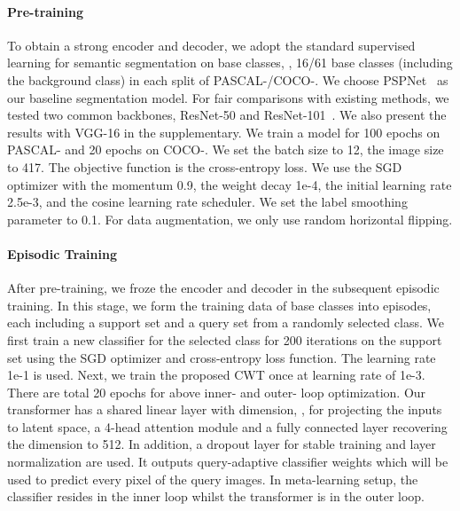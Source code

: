 \documentclass[10pt,twocolumn,letterpaper]{article}
\begin{document}
\paragraph{Pre-training} 
\label{sec:pretraining}
To obtain a strong encoder and decoder,
we adopt the standard supervised learning for semantic segmentation on base classes, \ie, 16/61 base classes (including the background class) in each split of PASCAL-/COCO-. We choose PSPNet~\cite{zhao2017pyramid} as our baseline segmentation model. 
For fair comparisons with existing methods, we tested two common backbones, ResNet-50 and ResNet-101~\cite{he2016deep}. 
We also present the results with VGG-16 in the supplementary.
We train a model for 100 epochs on PASCAL- and 20 epochs on COCO-.
We set the batch size to 12, the image size to 417.
The objective function is the cross-entropy loss. 
We use the SGD optimizer with the momentum 0.9, 
the weight decay 1e-4, the initial learning rate 2.5e-3,
and the cosine learning rate scheduler. 
We set the label smoothing parameter  to 0.1.
For data augmentation, we only use random horizontal flipping.
\vspace{-0.5cm}



\paragraph{Episodic Training}
After pre-training, we froze the encoder and decoder in the subsequent episodic training. 
In this stage, we form the training data of base classes into episodes, each including a support set and a query set from a randomly selected class. 
We first train a new classifier for the selected class for 
200 iterations on the support set using the SGD optimizer and cross-entropy loss function.
The learning rate 1e-1 is used.
Next, we train the proposed CWT once at learning rate of 1e-3.
There are total 20 epochs for above inner- and outer- loop optimization.
Our transformer has a shared linear layer with dimension, , for projecting the inputs to latent space, a 4-head attention module and a fully connected layer recovering the dimension to 512. In addition, a dropout layer for stable training and layer normalization are used.
It outputs query-adaptive classifier weights
which will be used to predict every pixel of the query images.
In meta-learning setup, the classifier resides in the inner loop whilst the transformer is in the outer loop.
\vspace{-0.5cm}
\end{document}
